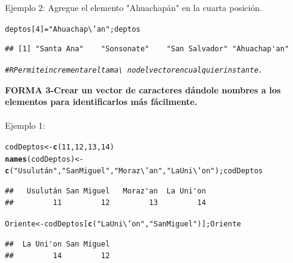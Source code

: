 \documentclass[12pt,letterpaper]{article}\usepackage[]{graphicx}\usepackage[]{color}
\makeatletter
\newcommand{\hlnum}[1]{\textcolor[rgb]{0.686,0.059,0.569}{#1}}%
\newcommand{\hlstr}[1]{\textcolor[rgb]{0.192,0.494,0.8}{#1}}%
\newcommand{\hlcom}[1]{\textcolor[rgb]{0.678,0.584,0.686}{\textit{#1}}}%
\newcommand{\hlstd}[1]{\textcolor[rgb]{0.345,0.345,0.345}{#1}}%
\newcommand{\hlkwb}[1]{\textcolor[rgb]{0.69,0.353,0.396}{#1}}%
\newcommand{\hlkwd}[1]{\textcolor[rgb]{0.737,0.353,0.396}{\textbf{#1}}}%
\newenvironment{kframe}{%
 \def\at@end@of@kframe{}%
 \ifinner\ifhmode%
  \def\at@end@of@kframe{\end{minipage}}%
  \begin{minipage}{\columnwidth}%
 \fi\fi%
 \def\FrameCommand##1{\hskip\@totalleftmargin \hskip-\fboxsep
 \colorbox{shadecolor}{##1}\hskip-\fboxsep
     \hskip-\linewidth \hskip-\@totalleftmargin \hskip\columnwidth}%
 \MakeFramed {\advance\hsize-\width
   \@totalleftmargin\z@ \linewidth\hsize
   \@setminipage}}%
 {\par\unskip\endMakeFramed%
 \at@end@of@kframe}
\newenvironment{knitrout}{}{} %
\makeatother
\begin{document}
Ejemplo 2: Agregue el elemento "Ahuachap\'an" en la cuarta posición.
\begin{knitrout}
\color{fgcolor}\begin{kframe}
\begin{alltt}
\hlstd{deptos[}\hlnum{4}\hlstd{]}\hlkwb{=}\hlstr{"Ahuachap\textbackslash{}'an"}\hlstd{; deptos}
\end{alltt}
\begin{verbatim}
## [1] "Santa Ana"    "Sonsonate"    "San Salvador" "Ahuachap'an"
\end{verbatim}
\begin{alltt}
\hlcom{# R Permite incrementar el tama\textbackslash{}~no del vector en cualquier instante.}
\end{alltt}
\end{kframe}
\end{knitrout}

\textbf{FORMA 3-Crear un vector de caracteres d\'andole nombres a los elementos para identificarlos m\'as f\'acilmente.}\\

\\ Ejemplo 1:
\begin{knitrout}
\color{fgcolor}\begin{kframe}
\begin{alltt}
\hlstd{codDeptos} \hlkwb{<-} \hlkwd{c}\hlstd{(}\hlnum{11}\hlstd{,} \hlnum{12}\hlstd{,} \hlnum{13}\hlstd{,} \hlnum{14}\hlstd{)}
\hlkwd{names}\hlstd{(codDeptos)} \hlkwb{<-} \hlkwd{c}\hlstd{(}\hlstr{"Usulután"}\hlstd{,} \hlstr{"San Miguel"}\hlstd{,} \hlstr{"Moraz\textbackslash{}'an"}\hlstd{,} \hlstr{"La Uni\textbackslash{}'on"}\hlstd{);codDeptos}
\end{alltt}
\begin{verbatim}
##   Usulután San Miguel   Moraz'an  La Uni'on 
##         11         12         13         14
\end{verbatim}
\begin{alltt}
\hlstd{Oriente} \hlkwb{<-} \hlstd{codDeptos [}\hlkwd{c}\hlstd{(}\hlstr{"La Uni\textbackslash{}'on"}\hlstd{,} \hlstr{"San Miguel"}\hlstd{)];Oriente}
\end{alltt}
\begin{verbatim}
##  La Uni'on San Miguel 
##         14         12
\end{verbatim}
\end{kframe}
\end{knitrout}
\end{document}
